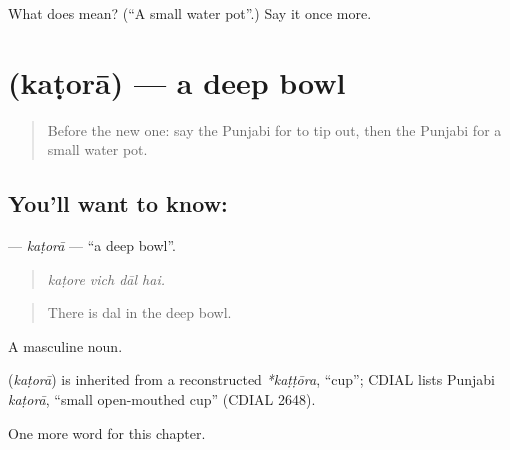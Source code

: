 \begin{tcolorbox}[breakable,colback=teal!4,colframe=teal!35!black,title={Before you move on}]
What does  mean? (\textquotedblleft{}A small water pot\textquotedblright{}.) Say it once more.
\end{tcolorbox}
\section[\texorpdfstring{\pa{ਕਟੋਰਾ} (kaṭorā)}{ਕਟੋਰਾ (kaṭorā)}]{ (kaṭorā) — a deep bowl}

\label{lesson:PA-C236-katora}



\begin{quote}
Before the new one: say the Punjabi for to tip out, then the Punjabi for a small water pot.
\end{quote}

\subsection*{You'll want to know: }
\textbf{} — \emph{kaṭorā} — \textquotedblleft{}a deep bowl\textquotedblright{}.

\begin{quote}
   
\end{quote}

\begin{quote}
\emph{kaṭore vich dāl hai.}
\end{quote}

\begin{quote}
There is dal in the deep bowl.
\end{quote}

A masculine noun.

\begin{cousinweb}
\textbf{} (\emph{kaṭorā}) is inherited from a reconstructed \emph{*kaṭṭōra}, \textquotedblleft{}cup\textquotedblright{}; CDIAL lists Punjabi \emph{kaṭorā}, \textquotedblleft{}small open-mouthed cup\textquotedblright{} (CDIAL 2648).
\end{cousinweb}

\begin{grammarlens}[title={What you've built}]
One more word for this chapter.
\end{grammarlens}

